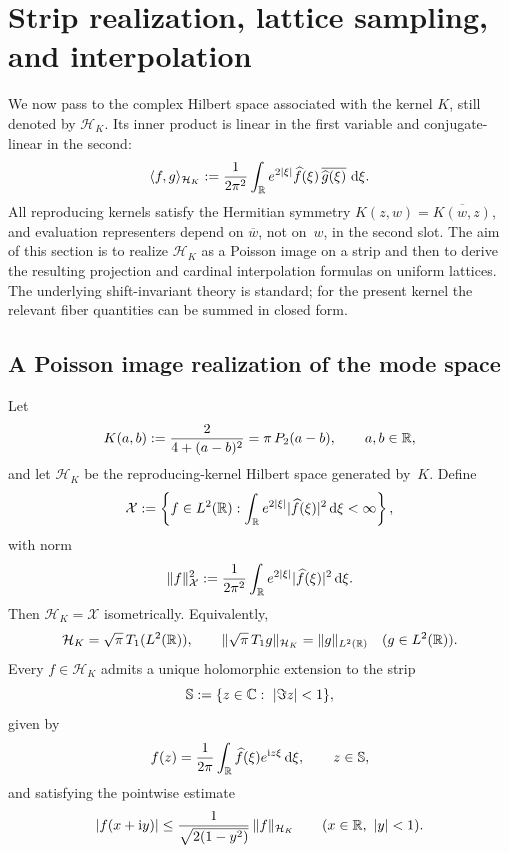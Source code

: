 \section{Strip realization, lattice sampling, and interpolation}%
\label{sec:strip-lattice}

We now pass to the complex Hilbert space associated with the kernel
$K$, still denoted by $\mathcal H_K$.  Its inner product is linear in
the first variable and conjugate-linear in the second:
\[
\langle f,g\rangle_{\mathcal H_K}
:=\frac{1}{2\pi^2}\int_{\mathbb{R}}e^{2|\xi|}\widehat f(\xi)\,
\overline{\widehat g(\xi)}\,\,\mathrm{d}\xi.
\]
All reproducing kernels satisfy the Hermitian symmetry
$K(z,w)=\overline{K(w,z)}$, and evaluation representers depend on
$\overline w$, not on~$w$, in the second slot.  The aim of this section
is to realize $\mathcal H_K$ as a Poisson image on a strip and then to
derive the resulting projection and cardinal interpolation formulas on
uniform lattices.  The underlying shift-invariant theory is standard;
for the present kernel the relevant fiber quantities can be summed in
closed form.

\subsection{A Poisson image realization of the mode space}

\begin{proposition}%
\label{thm:gram-space-poisson-image}
Let
\[
K(a,b):=\frac{2}{4+(a-b)^2}=\pi\,P_2(a-b),
\qquad a,b\in\mathbb{R},
\]
and let $\mathcal H_K$ be the reproducing-kernel Hilbert space generated
by~$K$.  Define
\[
\mathcal X
:=
\left\{
f\in L^2(\mathbb{R}):
\int_{\mathbb{R}}e^{2|\xi|}\lvert \widehat f(\xi)\rvert^2\,\mathrm{d}\xi<\infty
\right\},
\]
with norm
\[
\|f\|_{\mathcal X}^2
:=\frac{1}{2\pi^2}\int_{\mathbb{R}}e^{2|\xi|}\lvert \widehat f(\xi)\rvert^2\,\mathrm{d}\xi.
\]
Then $\mathcal H_K=\mathcal X$ isometrically.  Equivalently,
\[
\mathcal H_K=\sqrt{\pi}\,T_1(L^2(\mathbb{R})),
\qquad
\|\sqrt{\pi}\,T_1 g\|_{\mathcal H_K}=\|g\|_{L^2(\mathbb{R})}
\quad(g\in L^2(\mathbb{R})).
\]
Every $f\in\mathcal H_K$ admits a unique holomorphic extension to the
strip
\[
\mathbb S:=\{z\in\mathbb{C}:\ |\Im z|<1\},
\]
given by
\[
f(z)=\frac{1}{2\pi}\int_{\mathbb{R}}\widehat f(\xi)e^{\mathrm{i} z\xi}\,\mathrm{d}\xi,
\qquad z\in\mathbb S,
\]
and satisfying the pointwise estimate
\[
|f(x+\mathrm{i} y)|\le \frac{1}{\sqrt{2(1-y^2)}}\,\|f\|_{\mathcal H_K}
\qquad(x\in\mathbb{R},\ |y|<1).
\]
\end{proposition}

